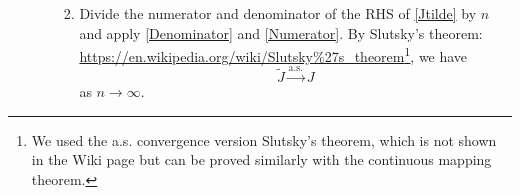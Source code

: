\documentclass[12pt]{article}
\begin{document}
\begin{itemize}
\begin{itemize}[label=*]
\begin{enumerate}
\begin{equation}
			\end{equation}
			\item Divide the numerator and denominator of the RHS of \eqref{Jtilde} by $n$ and apply \eqref{Denominator}
 and \eqref{Numerator}. By Slutsky's theorem:\\
			 \url{https://en.wikipedia.org/wiki/Slutsky\%27s_theorem}\footnote{We used the a.s. convergence version Slutsky's theorem, which is not shown in the Wiki page but can be proved similarly with the continuous mapping theorem.},
			 we have
			 $$
			 \tilde{J}\stackrel{\textrm{a.s.}}{\to} J
			 $$
			 as $n\to\infty$.
		 \end{enumerate}
	\end{itemize}
\end{itemize}
\end{document}
